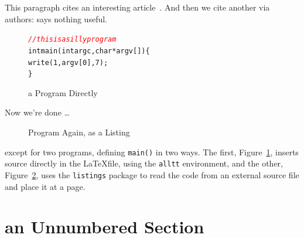 \documentclass{article}
\newcommand*{\figref}[1]{{Figure~\ref{#1}}}
\newcommand*{\code}[1]{\texttt{#1}} %
\newcommand*{\codecomment}[1]{\textsl{\textcolor{red}{{#1}}}}
\begin{document}
This paragraph cites an interesting article~\citep{foo}.
And then we cite another via authors: \citet*{bar} says nothing useful.

\begin{figure}[!h]
\begin{alltt}
          \codecomment{//this is a silly program}
          int main(int argc, char* argv[]) \{
              write(1, argv[0], 7); 
          \}
\end{alltt}
\caption{a Program Directly}\label{prog1}
\end{figure}

Now we're done \ldots
%
\begin{figure}[!b]

\caption{Program Again, as a Listing}\label{prog2}
\end{figure}
%
except for two programs, defining \code{main()} in two ways.  The first, \figref{prog1}, inserts source directly in the \LaTeX file, using the \code{alltt} environment, and the other, \figref{prog2}, uses the \code{listings} package to read the code from an external source file and place it at a page.

\section*{an Unnumbered Section}
\end{document}
